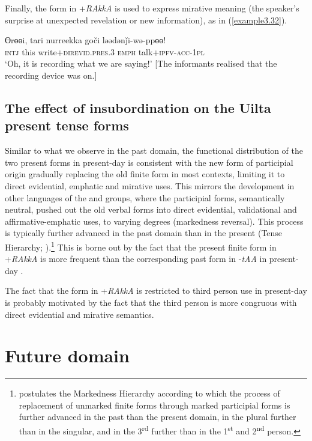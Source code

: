 \documentclass[output=paper,colorlinks,citecolor=brown]{langscibook}
\begin{document}
Finally, the form in +\textit{RAkkA} is used to express mirative meaning (the speaker’s surprise at unexpected revelation or new information), as in (\ref{example3.32}).

\ea
\label{example3.32}
\gll Ɵrɵɵi,	tari	nurreekka				goči		ləədənǰi-wə-ppɵɵ!\\
     \textsc{intj}		this	write+\textsc{direvid}.\textsc{pres}.\textsc{3}		\textsc{emph}	talk+\textsc{ipfv}-\textsc{acc}-\textsc{1pl}\\
\glt `Oh, it is recording what we are saying!’ [The informants realised that the recording device was on.]
\z

\subsection{The effect of insubordination on the Uilta present tense forms}\label{Section3.4.3}

Similar to what we observe in the past domain, the functional distribution of the two present forms in present-day  is consistent with the new form of participial origin gradually replacing the old finite form in most contexts, limiting it to direct evidential, emphatic and mirative uses. This mirrors the development in other languages of the  and  groups, where the participial forms, semantically neutral, pushed out the old verbal forms into direct evidential, validational and affirmative-emphatic uses, to varying degrees (markedness reversal). This process is typically further advanced in the past domain than in the present (Tense Hierarchy; \citealt{Malchukov_2000}).\footnote{\label{footnote9}\citet[450]{Malchukov_2000} postulates the Markedness Hierarchy according to which the process of replacement of unmarked finite forms through marked participial forms is further advanced in the past than the present domain, in the plural further than in the singular, and in the 3\textsuperscript{rd} further than in the 1\textsuperscript{st} and 2\textsuperscript{nd} person.} This is borne out by the fact that the present finite form in +\textit{RAkkA} is more frequent than the corresponding past form in -\textit{tAA} in present-day . 

The fact that the form in +\textit{RAkkA} is restricted to third person use in present-day  is probably motivated by the fact that the third person is more congruous with direct evidential and mirative semantics.


\section{Future domain}\label{Section3.5}
\end{document}
